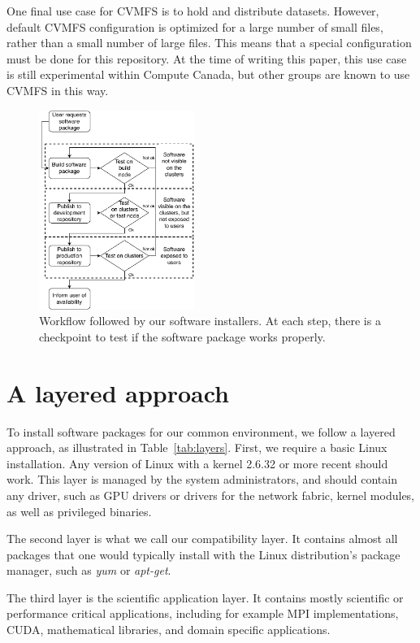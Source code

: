 \documentclass[sigconf]{acmart}
\begin{document}
One final use case for CVMFS is to hold and distribute datasets. However, default CVMFS configuration is optimized for a large number of small files, rather than a small number of large files. This means that a special configuration must be done for this repository. At the time of writing this paper, this use case is still experimental within Compute Canada, but other groups are known to use CVMFS in this way.

\begin{figure}
  \includegraphics[width=0.45\textwidth]{Software-installation-workflow.pdf}
  \caption{Workflow followed by our software installers. At each step, there is a checkpoint to test if the software package works properly.}
  \label{fig:Workflow}
\end{figure}



\section{A layered approach}
\label{sec:Layered_environment}
To install software packages for our common environment, we follow a layered approach, as illustrated in Table~\ref{tab:layers}. First, we require a basic Linux installation. Any version of Linux with a kernel 2.6.32 or more recent should work. This layer is managed by the system administrators, and should contain any driver, such as GPU drivers or drivers for the network fabric, kernel modules, as well as privileged binaries. 

The second layer is what we call our compatibility layer. It contains almost all packages that one would typically install with the Linux distribution's package manager, such as {\it yum} or {\it apt-get}. 

The third layer is the scientific application layer. It contains mostly scientific or performance critical applications, including for example MPI implementations, CUDA, mathematical libraries, and domain specific applications. 
\end{document}
